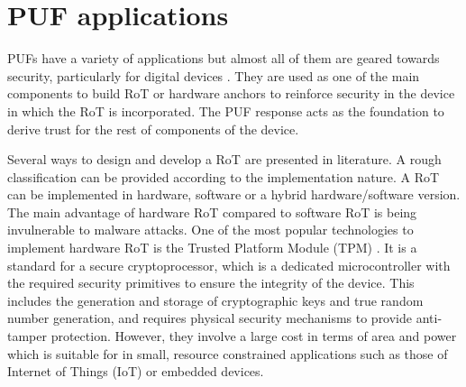 
\section{PUF applications}
\label{sec:applications}
PUFs have a variety of applications but almost all of them are geared towards security, particularly for digital devices \cite{Maes2010,Bohm2013,Xu2015}. They are used as one of the main components to build RoT or hardware anchors to reinforce security in the device in which the RoT is incorporated. The PUF response acts as the foundation to derive trust for the rest of components of the device. 

Several ways to design and develop a RoT are presented in literature. A rough classification can be provided according to the implementation nature. A RoT can be implemented in hardware, software or a hybrid hardware/software version. The main advantage of hardware RoT compared to software RoT is being invulnerable to malware attacks. One of the most popular technologies to implement hardware RoT is the Trusted Platform Module (TPM) \cite{TPM}. It is a standard for a secure cryptoprocessor, which is a dedicated microcontroller with the required security primitives to ensure the integrity of the device. This includes the generation and storage of cryptographic keys and true random number generation, and requires physical security mechanisms to provide anti-tamper protection. However, they involve a large cost in terms of area and power which is suitable for in small, resource constrained applications such as those of Internet of Things (IoT) or embedded devices.

